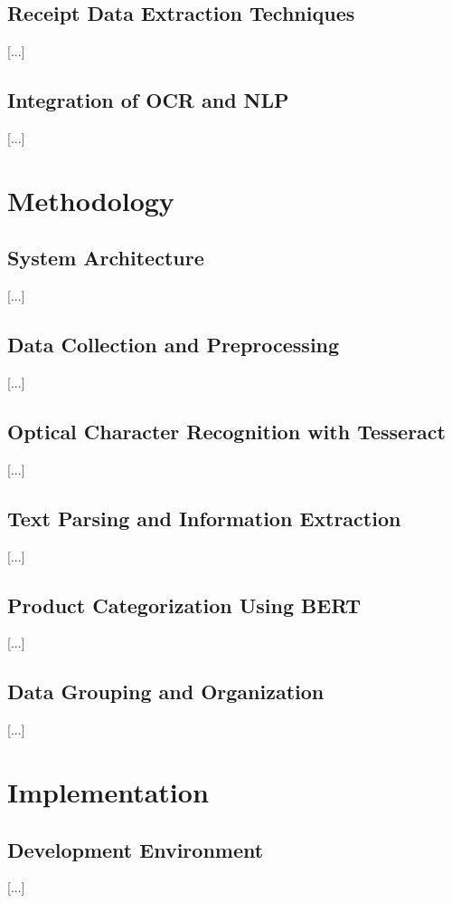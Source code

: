 \documentclass{SGGW-thesis-EN}
\begin{document}
\section{Receipt Data Extraction Techniques}
[...]

\section{Integration of OCR and NLP}
[...]

\chapter{Methodology}

\section{System Architecture}
[...]

\section{Data Collection and Preprocessing}
[...]

\section{Optical Character Recognition with Tesseract}
[...]

\section{Text Parsing and Information Extraction}
[...]

\section{Product Categorization Using BERT}
[...]

\section{Data Grouping and Organization}
[...]

\chapter{Implementation}

\section{Development Environment}
[...]
\end{document}
